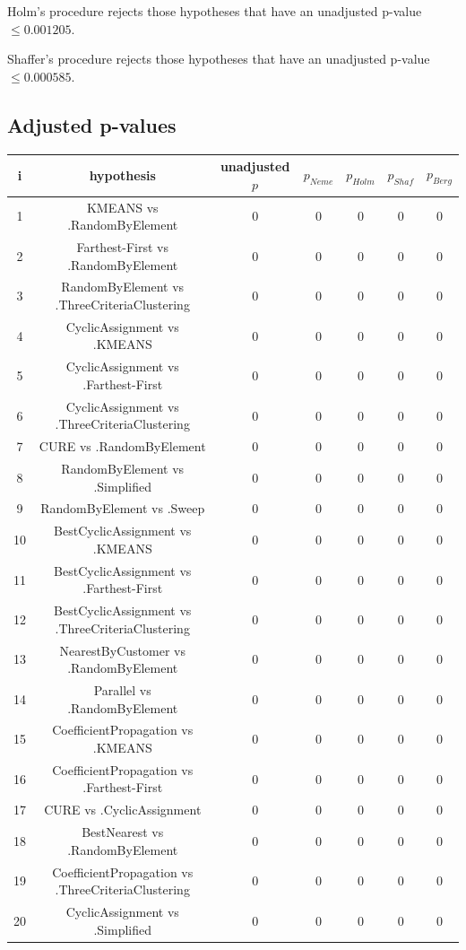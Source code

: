 \documentclass[a4paper,10pt]{article}
\begin{document}
\begin{landscape}
Holm's procedure rejects those hypotheses that have an unadjusted p-value $\le0.001205$.

Shaffer's procedure rejects those hypotheses that have an unadjusted p-value $\le0.000585$.

\pagebreak

\subsection{Adjusted p-values}

\begin{table}[!htp]
\centering\scriptsize
\begin{tabular}{ccccccc}
i&hypothesis&unadjusted $p$&$p_{Neme}$&$p_{Holm}$&$p_{Shaf}$&$p_{Berg}$\\
\hline1&KMEANS vs .RandomByElement&0&0&0&0&0\\
2&Farthest-First vs .RandomByElement&0&0&0&0&0\\
3&RandomByElement vs .ThreeCriteriaClustering&0&0&0&0&0\\
4&CyclicAssignment vs .KMEANS&0&0&0&0&0\\
5&CyclicAssignment vs .Farthest-First&0&0&0&0&0\\
6&CyclicAssignment vs .ThreeCriteriaClustering&0&0&0&0&0\\
7&CURE vs .RandomByElement&0&0&0&0&0\\
8&RandomByElement vs .Simplified&0&0&0&0&0\\
9&RandomByElement vs .Sweep&0&0&0&0&0\\
10&BestCyclicAssignment vs .KMEANS&0&0&0&0&0\\
11&BestCyclicAssignment vs .Farthest-First&0&0&0&0&0\\
12&BestCyclicAssignment vs .ThreeCriteriaClustering&0&0&0&0&0\\
13&NearestByCustomer vs .RandomByElement&0&0&0&0&0\\
14&Parallel vs .RandomByElement&0&0&0&0&0\\
15&CoefficientPropagation vs .KMEANS&0&0&0&0&0\\
16&CoefficientPropagation vs .Farthest-First&0&0&0&0&0\\
17&CURE vs .CyclicAssignment&0&0&0&0&0\\
18&BestNearest vs .RandomByElement&0&0&0&0&0\\
19&CoefficientPropagation vs .ThreeCriteriaClustering&0&0&0&0&0\\
20&CyclicAssignment vs .Simplified&0&0&0&0&0\\

\end{tabular}
\end{table}
\end{landscape}
\end{document}
